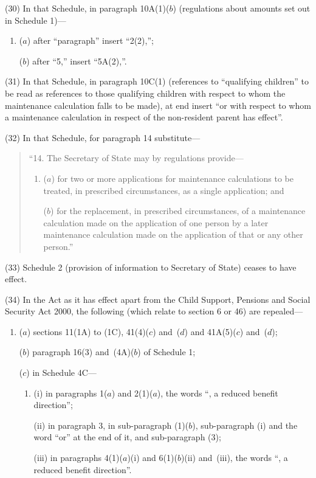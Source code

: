 \documentclass[12pt,a4paper]{article}
\begin{document}
(30) In that Schedule, in paragraph 10A(1)($b$) (regulations about amounts set out in Schedule 1)—
\begin{enumerate}\item[]
($a$) after “paragraph” insert  “2(2),”;

($b$) after “5,” insert  “5A(2),”.
\end{enumerate}

(31) In that Schedule, in paragraph 10C(1) (references to “qualifying children” to be read as references to those qualifying children with respect to whom the maintenance calculation falls to be made), at end insert  “or with respect to whom a maintenance calculation in respect of the non-resident parent has effect”.

(32) In that Schedule, for paragraph 14 substitute—
\begin{quotation}
“14. The Secretary of State may by regulations provide—
\begin{enumerate}\item[]
($a$) for two or more applications for maintenance calculations to be treated, in prescribed circumstances, as a single application; and

($b$) for the replacement, in prescribed circumstances, of a maintenance calculation made on the application of one person by a later maintenance calculation made on the application of that or any other person.”
\end{enumerate}
\end{quotation}

(33) Schedule 2 (provision of information to Secretary of State) ceases to have effect.

(34) In the Act as it has effect apart from the Child Support, Pensions and Social Security Act 2000, the following (which relate to section 6 or 46) are repealed—
\begin{enumerate}\item[]
($a$) sections 11(1A) to (1C), 41(4)($c$) and~($d$) and 41A(5)($c$) and~($d$);

($b$) paragraph 16(3) and~(4A)($b$) of Schedule 1;

($c$) in Schedule 4C—
\begin{enumerate}\item[]
(i) in paragraphs 1($a$) and 2(1)($a$), the words “, a reduced benefit direction”;

(ii) in paragraph 3, in sub-paragraph (1)($b$), sub-paragraph (i) and the word “or” at the end of it, and sub-paragraph (3);

(iii) in paragraphs 4(1)($a$)(i) and 6(1)($b$)(ii) and~(iii), the words “, a reduced benefit direction”.
\end{enumerate}
\end{enumerate}
\end{document}
